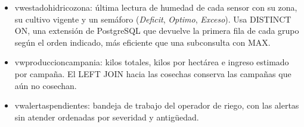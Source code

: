 \documentclass[11pt,letterpaper]{article}
\newcommand{\tbus}{\textunderscore\allowbreak}
\newcommand{\tb}[1]{{\ttfamily\let\_\tbus #1}}
\begin{document}
\begin{itemize}[leftmargin=1.4em,itemsep=0.1em]
\item \tb{vw\_estado\_hidrico\_zona}: última lectura de humedad de cada sensor con su zona, su cultivo vigente y un semáforo (\emph{Deficit}, \emph{Optimo}, \emph{Exceso}). Usa \tb{DISTINCT ON}, una extensión de PostgreSQL que devuelve la primera fila de cada grupo según el orden indicado, más eficiente que una subconsulta con \tb{MAX}.
\item \tb{vw\_produccion\_campania}: kilos totales, kilos por hectárea e ingreso estimado por campaña. El \tb{LEFT JOIN} hacia las cosechas conserva las campañas que aún no cosechan.
\item \tb{vw\_alertas\_pendientes}: bandeja de trabajo del operador de riego, con las alertas sin atender ordenadas por severidad y antigüedad.
\end{itemize}
\end{document}
